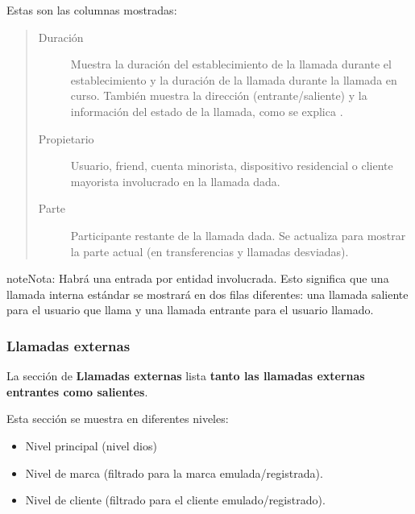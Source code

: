 \documentclass[letterpaper,10pt,spanish]{sphinxmanual}
\begin{document}
Estas son las columnas mostradas:
\begin{quote}
\begin{description}
\item[{Duración}] \leavevmode
Muestra la duración del establecimiento de la llamada durante el establecimiento y la duración de la llamada durante la llamada en curso. También muestra la dirección (entrante/saliente) y la información del estado de la llamada, como se explica {\hyperref[administration_portal/platform/active_calls:call\string-state]{}}.

\item[{Propietario}] \leavevmode
Usuario, friend, cuenta minorista, dispositivo residencial o cliente mayorista involucrado en la llamada dada.

\item[{Parte}] \leavevmode
Participante restante de la llamada dada. Se actualiza para mostrar la parte actual (en transferencias y llamadas desviadas).

\end{description}
\end{quote}

\begin{notice}{note}{Nota:}
Habrá una entrada por entidad involucrada. Esto significa que una llamada interna estándar se mostrará en dos filas diferentes: una llamada saliente para el usuario que llama y una llamada entrante para el usuario llamado.
\end{notice}


\subsubsection{Llamadas externas}
\label{administration_portal/client/vpbx/calls/external_calls::doc}\label{administration_portal/client/vpbx/calls/external_calls:external-calls}
La sección de \textbf{Llamadas externas} lista \textbf{tanto las llamadas externas entrantes como salientes}.

Esta sección se muestra en diferentes niveles:
\begin{itemize}
\item {} 
Nivel principal (nivel dios)

\item {} 
Nivel de marca (filtrado para la marca emulada/registrada).

\item {} 
Nivel de cliente (filtrado para el cliente emulado/registrado).

\end{itemize}
\end{document}
